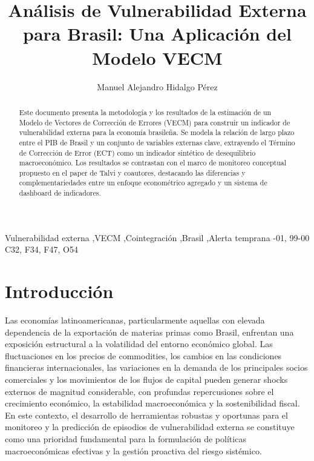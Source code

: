 \documentclass[3p,11pt]{elsarticle}
\begin{document}
\begin{frontmatter}

\title{Análisis de Vulnerabilidad Externa para Brasil: Una Aplicación del Modelo VECM}

\author[inst1]{Manuel Alejandro Hidalgo Pérez}
\address[inst1]{Departamento de Economía, Universidad Pablo de Olavide, Sevilla, España}

\begin{abstract}
Este documento presenta la metodología y los resultados de la estimación de un Modelo de Vectores de Corrección de Errores (VECM) para construir un indicador de vulnerabilidad externa para la economía brasileña. Se modela la relación de largo plazo entre el PIB de Brasil y un conjunto de variables externas clave, extrayendo el Término de Corrección de Error (ECT) como un indicador sintético de desequilibrio macroeconómico. Los resultados se contrastan con el marco de monitoreo conceptual propuesto en el paper de Talvi y coautores, destacando las diferencias y complementariedades entre un enfoque econométrico agregado y un sistema de dashboard de indicadores.
\end{abstract}

\begin{keyword}
Vulnerabilidad externa \sep VECM \sep Cointegración \sep Brasil \sep Alerta temprana
-01, 99-00
\JEL C32, F34, F47, O54
\end{keyword}

\end{frontmatter}

\section{Introducción}

Las economías latinoamericanas, particularmente aquellas con elevada dependencia de la exportación de materias primas como Brasil, enfrentan una exposición estructural a la volatilidad del entorno económico global. Las fluctuaciones en los precios de commodities, los cambios en las condiciones financieras internacionales, las variaciones en la demanda de los principales socios comerciales y los movimientos de los flujos de capital pueden generar shocks externos de magnitud considerable, con profundas repercusiones sobre el crecimiento económico, la estabilidad macroeconómica y la sostenibilidad fiscal. En este contexto, el desarrollo de herramientas robustas y oportunas para el monitoreo y la predicción de episodios de vulnerabilidad externa se constituye como una prioridad fundamental para la formulación de políticas macroeconómicas efectivas y la gestión proactiva del riesgo sistémico.
\end{document}
